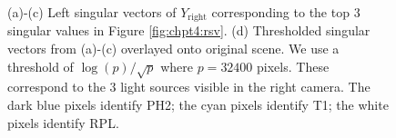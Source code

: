 \begin{figure}
  \begin{center}
    \caption{(a)-(c) Left singular vectors of $Y_{\text{right}}$ corresponding to the top
      3 singular values in Figure \ref{fig:chpt4:rsv}. (d) Thresholded singular vectors
      from (a)-(c) overlayed onto original scene. We use a threshold of $\log(p)/\sqrt{p}$
      where $p=32400$ pixels. These correspond to the 3 light sources visible in the right
      camera. The dark blue pixels identify PH2; the cyan pixels identify T1; the white
      pixels identify RPL.}
    \label{fig:chpt4:flashing_UR}
  \end{center}
\end{figure}

